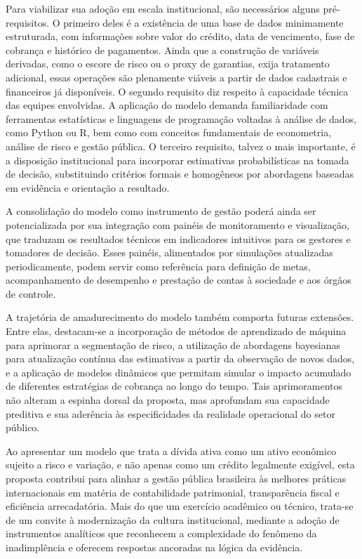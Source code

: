 \documentclass[a4paper,12pt]{article}
\begin{document}
Para viabilizar sua adoção em escala institucional, são necessários alguns pré-requisitos. O primeiro deles é a existência de uma base de dados minimamente estruturada, com informações sobre valor do crédito, data de vencimento, fase de cobrança e histórico de pagamentos. Ainda que a construção de variáveis derivadas, como o escore de risco ou o proxy de garantias, exija tratamento adicional, essas operações são plenamente viáveis a partir de dados cadastrais e financeiros já disponíveis. O segundo requisito diz respeito à capacidade técnica das equipes envolvidas. A aplicação do modelo demanda familiaridade com ferramentas estatísticas e linguagens de programação voltadas à análise de dados, como Python ou R, bem como com conceitos fundamentais de econometria, análise de risco e gestão pública. O terceiro requisito, talvez o mais importante, é a disposição institucional para incorporar estimativas probabilísticas na tomada de decisão, substituindo critérios formais e homogêneos por abordagens baseadas em evidência e orientação a resultado.

A consolidação do modelo como instrumento de gestão poderá ainda ser potencializada por sua integração com painéis de monitoramento e visualização, que traduzam os resultados técnicos em indicadores intuitivos para os gestores e tomadores de decisão. Esses painéis, alimentados por simulações atualizadas periodicamente, podem servir como referência para definição de metas, acompanhamento de desempenho e prestação de contas à sociedade e aos órgãos de controle.

A trajetória de amadurecimento do modelo também comporta futuras extensões. Entre elas, destacam-se a incorporação de métodos de aprendizado de máquina para aprimorar a segmentação de risco, a utilização de abordagens bayesianas para atualização contínua das estimativas a partir da observação de novos dados, e a aplicação de modelos dinâmicos que permitam simular o impacto acumulado de diferentes estratégias de cobrança ao longo do tempo. Tais aprimoramentos não alteram a espinha dorsal da proposta, mas aprofundam sua capacidade preditiva e sua aderência às especificidades da realidade operacional do setor público.

Ao apresentar um modelo que trata a dívida ativa como um ativo econômico sujeito a risco e variação, e não apenas como um crédito legalmente exigível, esta proposta contribui para alinhar a gestão pública brasileira às melhores práticas internacionais em matéria de contabilidade patrimonial, transparência fiscal e eficiência arrecadatória. Mais do que um exercício acadêmico ou técnico, trata-se de um convite à modernização da cultura institucional, mediante a adoção de instrumentos analíticos que reconhecem a complexidade do fenômeno da inadimplência e oferecem respostas ancoradas na lógica da evidência.

\newpage



\end{document}
